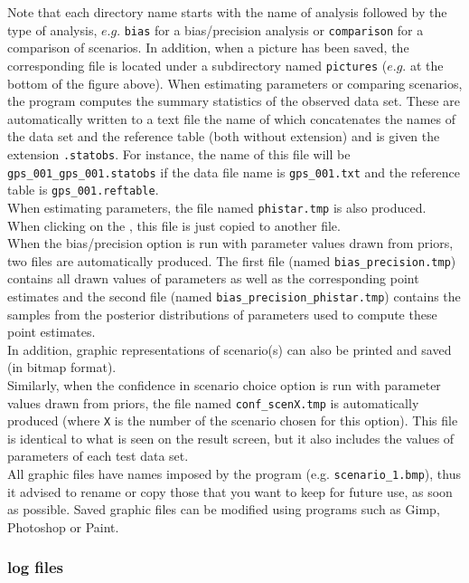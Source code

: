 Note that each directory name starts with the name of analysis followed by the type of analysis, $e.g.$ \texttt{bias} for a bias/precision analysis or \texttt{comparison} for a comparison of scenarios. In addition, when a picture has been saved, the corresponding file is located under a subdirectory named \texttt{pictures} ($e.g.$ at the bottom of the figure above).
When estimating parameters or comparing scenarios, the program computes the summary statistics of the observed data set. These are automatically written to a text file the name of which concatenates the names of the data set and the reference table (both without extension) and is given the extension \texttt{.statobs}. For instance, the name of this file will be \texttt{gps\_001\_gps\_001.statobs} if the data file name is \texttt{gps\_001.txt} and the reference table is \texttt{gps\_001.reftable}.\\
 When estimating parameters, the file named \texttt{phistar.tmp} is also produced. When clicking on the , this file is just copied to another file.\\
 When the bias/precision option is run with parameter values drawn from priors, two files  are automatically produced. The first file (named \texttt{bias\_precision.tmp}) contains all drawn values of parameters as well as the corresponding point estimates and the second file (named \texttt{bias\_precision\_phistar.tmp}) contains the samples from the posterior distributions of parameters used to compute these point estimates.\\
In addition, graphic representations of scenario(s) can also be printed and saved (in bitmap format).\\
Similarly, when the confidence in scenario choice option is run with parameter values drawn from priors, the file named \texttt{conf\_scenX.tmp} is automatically produced (where \texttt{X} is the number of the scenario chosen for this option). This file is identical to what is seen on the result screen, but it also includes the values of parameters of each test data set.\\
All graphic files have names imposed by the program (e.g.  \texttt{scenario\_1.bmp}),  thus it advised to rename or copy those that you want to keep for future use, as soon as possible. Saved graphic files can be modified using programs such as Gimp, Photoshop or Paint. 
\subsubsection{log files}


